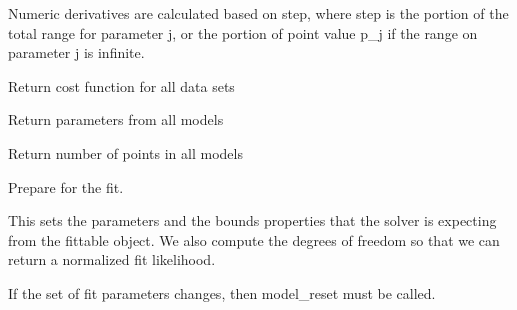 \documentclass[letterpaper,10pt,english]{sphinxmanual}
\begin{document}
\begin{fulllineitems}
\begin{fulllineitems}
Numeric derivatives are calculated based on step, where step is
the portion of the total range for parameter j, or the portion of
point value p\_j if the range on parameter j is infinite.

\end{fulllineitems}


\begin{fulllineitems}
\label{api/fitproblem:refl1d.fitproblem.MultiFitProblem.model_nllf}
Return cost function for all data sets

\end{fulllineitems}


\begin{fulllineitems}
\label{api/fitproblem:refl1d.fitproblem.MultiFitProblem.model_parameters}
Return parameters from all models

\end{fulllineitems}


\begin{fulllineitems}
\label{api/fitproblem:refl1d.fitproblem.MultiFitProblem.model_points}
Return number of points in all models

\end{fulllineitems}


\begin{fulllineitems}
\label{api/fitproblem:refl1d.fitproblem.MultiFitProblem.model_reset}
Prepare for the fit.

This sets the parameters and the bounds properties that the
solver is expecting from the fittable object.  We also compute
the degrees of freedom so that we can return a normalized fit
likelihood.

If the set of fit parameters changes, then model\_reset must
be called.

\end{fulllineitems}


\end{fulllineitems}
\end{document}
